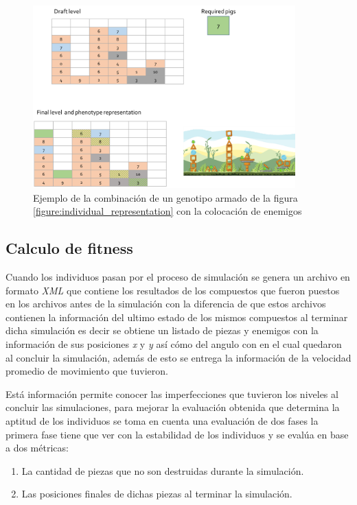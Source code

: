 \begin{figure}
  \centering
  \includegraphics[width=0.9\textwidth]{img/layer123_combine.png}
  \caption{Ejemplo de la combinación de un genotipo armado de la figura \ref{figure:individual_representation} con la colocación de enemigos}
  \label{figure:ind_representation_plus_pigs}
\end{figure}

\subsection{Calculo de fitness}
\label{subsection:fitness_calculation}

Cuando los individuos pasan por el proceso de simulación se genera un archivo en
formato \textit{XML} que contiene los resultados de los compuestos que fueron
puestos en los archivos antes de la simulación con la diferencia de que estos
archivos contienen la información del ultimo estado de los mismos compuestos al
terminar dicha simulación es decir se obtiene un listado de piezas y enemigos con
la información de sus posiciones \textit{x} y \textit{y} así cómo del angulo con
en el cual quedaron al concluir la simulación, además de esto se entrega la
información de la velocidad promedio de movimiento que tuvieron.

Está información permite conocer las imperfecciones que tuvieron los niveles al
concluir las simulaciones, para mejorar la evaluación obtenida que determina la
aptitud de los individuos se toma en cuenta una evaluación de dos fases la
primera fase tiene que ver con la estabilidad de los individuos y se evalúa en
base a dos métricas:
\begin{enumerate}
    \item La cantidad de piezas que no son destruidas durante la simulación.
    \item Las posiciones finales de dichas piezas al terminar la simulación.
\end{enumerate}

